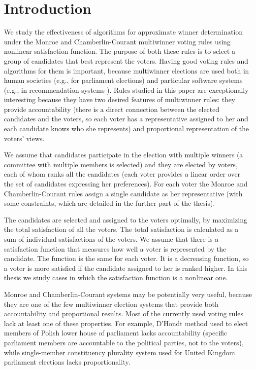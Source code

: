 \chapter{Introduction}
\label{cha:introduction}

We study the effectiveness of algorithms for approximate winner determination under the \linebreak Monroe \cite{8} and Chamberlin-Courant \cite{9} multiwinner voting rules using nonlinear satisfaction function. The purpose of both these rules is to select a group of candidates that best represent the voters. Having good voting rules and algorithms for them is important, because multiwinner elections are used both in human societies (e.g., for parliament elections) and particular software systems (e.g., in recommendation systems \cite{4}). Rules studied in this paper are exceptionally interesting because they have two desired features of multiwinner rules: they provide accountability (there is a direct connection between the elected candidates and the voters, so each voter has a representative assigned to her and each candidate knows who she represents) and proportional representation of the voters’ views.

We assume that candidates participate in the election with multiple winners (a committee with multiple members is selected) and they are elected by voters, each of whom ranks all the candidates (each voter provides a linear order over the set of candidates expressing her preferences). For each voter the Monroe and Chamberlin-Courant rules assign a single candidate as her representative (with some constraints, which are detailed in the further part of the thesis).

The candidates are selected and assigned to the voters optimally, by maximizing the total satisfaction of all the voters. The total satisfaction is calculated as a sum of individual satisfactions of the voters. We assume that there is a  satisfaction function that measures how well a voter is represented by the candidate. The function is the same for each voter. It is a decreasing function, so a voter is more satisfied if the candidate assigned to her is ranked higher. In this thesis we study cases in which the satisfaction function is a nonlinear one.

Monroe and Chamberlin-Courant systems may be potentially very useful, because they are one of the few multiwinner election systems that provide both accountability and proportional results. Most of the currently used voting rules lack at least one of these properties. For example, D'Hondt method used to elect members of Polish lower house of parliament lacks accountability (specific parliament members are accountable to the political parties, not to the voters), while single-member constituency plurality system used for United Kingdom parliament elections lacks proportionality.

